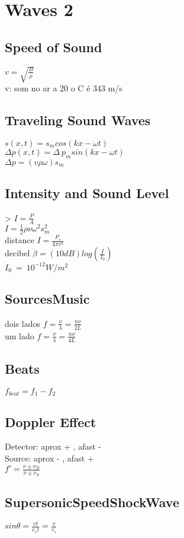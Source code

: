 \section{Waves 2}
\subsection{Speed of Sound}
$v=\sqrt{\frac{B}{\rho }}$\\
v: som no ar a 20 o C é 343 m/s\\
\subsection{Traveling Sound Waves}
$s\left(x,t\right)=s_mcos\left(kx-\omega t\right)$\\
$\Delta p\left(x,t\right)=\Delta \:p_msin\left(kx-\omega t\right)$\\
$\Delta p=\left(v\rho \omega \right)s_m$\\
\subsection{Intensity and Sound Level}
> $I=\frac{P}{A}$\\
$I=\frac{1}{2}\rho \nu \omega ^2s_m^2$\\
distance $I=\frac{P_s}{4\pi r^2}$\\
decibel $\beta =\left(10dB\right)log\left(\frac{I}{I_0}\right)$\\
$I_0\:=\:10^{-12} W/m^2$\\
\subsection{SourcesMusic}
dois lados $f=\frac{\nu }{\lambda }=\frac{n\nu }{2L}$\\
um lado $f=\frac{\nu }{\lambda }=\frac{n\nu }{4L}$\\
\subsection{Beats}
$f_{beat}=f_1-f_2$\\
\subsection{Doppler Effect}
Detector: aprox + , afast - \\
Source: aprox - , afast + \\
$f'=\frac{\nu \pm \nu _D}{\nu \pm \nu _S}$\\
\subsection{SupersonicSpeedShockWave}
$sin\theta =\frac{vt}{v_st}=\frac{v}{v_s}$\\